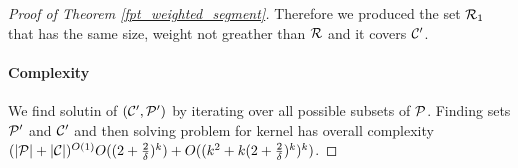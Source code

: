\begin{proof}[Proof of Theorem \ref{fpt_weighted_segment}]
Therefore we produced the set $\mathcal{R}_1$ that has the same size,
weight not greather than $\mathcal{R}$ and it covers $\mathcal{C}'$.

\paragraph{Complexity}
We find solutin of $(\mathcal{C}', \mathcal{P}')$ by iterating
over all possible subsets of $\mathcal{P}$.
Finding sets $\mathcal{P}'$ and $\mathcal{C}'$ and then solving 
problem for kernel has overall complexity
$(|\mathcal{P}| + |\mathcal{C}|)^{O(1)}O((2 + \frac{2}{\delta})^k) + O((k^2 + k(2 + \frac{2}{\delta})^k)^k)$.
\end{proof}


